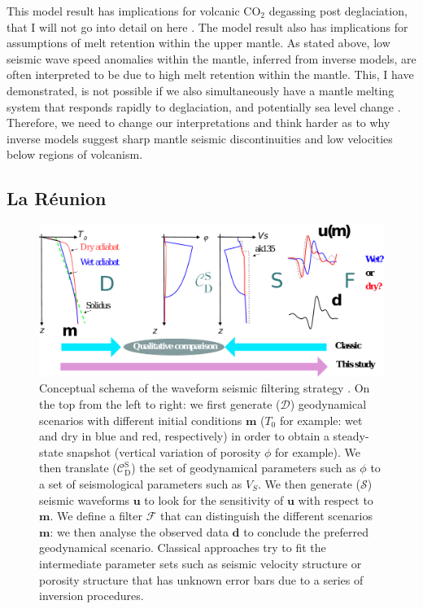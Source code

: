 This model result has implications for volcanic CO$_{2}$ degassing post deglaciation, that I will not go into detail on here \citep[see][]{armitage-etal-grl-2019}. The model result also has implications for assumptions of melt retention within the upper mantle. As stated above, low seismic wave speed anomalies within the mantle, inferred from inverse models, are often interpreted to be due to high melt retention within the mantle. This, I have demonstrated, is not possible if we also simultaneously have a mantle melting system that responds rapidly to deglaciation, and potentially sea level change \citep{huybers-2009}. Therefore, we need to change our interpretations and think harder as to why inverse models suggest sharp mantle seismic discontinuities and low velocities below regions of volcanism.

\subsection{La Réunion}

\begin{figure}
\centering
\includegraphics[width=\textwidth]{figures/ch2-schema.pdf}
\caption{Conceptual schema of the waveform seismic filtering strategy \citep[see][]{franken-etal-2020}. On the top from the left to right: we first generate ($\mathcal{D}$)  geodynamical scenarios with different initial conditions $\mathbf{m}$ ($T_0$ for example: wet and dry in blue and red, respectively) in order to obtain a steady-state snapshot (vertical variation of porosity $\phi$ for example). We then translate  ($\mathcal{C}_\mathrm{D}^\mathrm{S}$) the set of geodynamical parameters such as $\phi$ to a set of seismological parameters such as $V_S$. We then generate ($\mathcal{S}$) seismic waveforms $\mathbf{u}$ to look for the sensitivity of $\mathbf{u}$ with respect to $\mathbf{m}$. We define a filter $\mathcal{F}$ that can distinguish the different scenarios $\mathbf{m}$: we then analyse the observed data $\mathbf{d}$ to conclude the preferred geodynamical scenario. Classical approaches try to fit the intermediate parameter sets such as seismic velocity structure or porosity structure that has unknown error bars due to a series of inversion procedures.}
\label{fg:inversion}
\end{figure}

